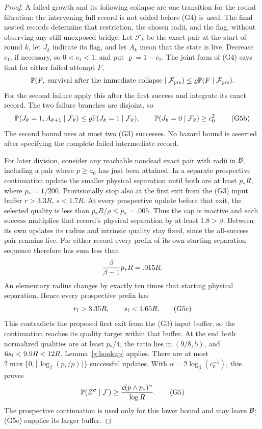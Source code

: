 \begin{proof}
A failed growth and its following collapse are one transition for the
round filtration: the intervening full record is not added before (G4)
is used.  The final nested records determine that restriction, the chosen
radii, and the flag, without observing any still unexposed bridge.  Let
\(\mathcal F_k\) be the exact pair at the start of round \(k\), let
\(J_k\) indicate its flag, and let \(A_k\) mean that the state is live.
Decrease \(c_1\), if necessary, so \(0<c_1<1\), and put
\(\varrho=1-c_1\).  The joint form of (G4) says that for either failed
attempt \(F\),
\[
 \mathbb P(F,\text{ survival after the immediate collapse}\mid
                  \mathcal F_{\rm pre})
 \le\varrho\mathbb P(F\mid\mathcal F_{\rm pre}).
\]
For the second failure apply this after the first success and integrate
its exact record.  The two failure branches are disjoint, so
\[
 \mathbb P(J_k=1,A_{k+1}\mid\mathcal F_k)
       \le\varrho\mathbb P(J_k=1\mid\mathcal F_k),\qquad
 \mathbb P(J_k=0\mid\mathcal F_k)\ge c_0^2.                    \tag{G5b}
\]
The second bound uses at most two (G3) successes.  No hazard bound is
asserted after specifying the complete failed intermediate record.

For later division, consider any reachable nondead exact pair with radii
in \({\cal B}\), including a pair where \(p\ge a_0\) has just been
attained.  In a separate prospective continuation update the smaller
physical separation until both are at least \(p_*R\), where
\(p_*=1/200\).  Provisionally stop also at the first exit from the (G3)
input buffer \(r>3.3R\), \(s<1.7R\).  At every prospective update before
that exit, the selected quality is less than \(p_*R/\rho\le p_*=.005\).
Thus the cap is inactive and each success multiplies that record's physical
separation by at least \(1.8>\beta\).  Between its own updates its radius
and intrinsic quality stay fixed, since the all-success pair remains live.
For either record every prefix of its own starting-separation sequence
therefore has sum less than
\[
 {\beta\over\beta-1}p_*R=.015R.
\]
An elementary radius changes by exactly ten times that starting physical
separation.  Hence every prospective prefix has
\[
 r_{\rm f}>3.35R,\qquad s_{\rm f}<1.65R.                   \tag{G5c}
\]
This contradicts the proposed first exit from the (G3) input buffer, so
the continuation reaches its quality target within that buffer.  At the
end both normalized qualities
are at least \(p_*/4\), the ratio lies in \((9/8,5)\), and
\(6s_{\rm f}<9.9R<12R\).  Lemma~\ref{g:hookup} applies.  There are at
most \(2\max\{0,\lceil\log_\beta(p_*/p)\rceil\}\) successful updates.
With \(\alpha=2\log_\beta(c_0^{-1})\), this proves
\[
 \mathbb P(Z^\sigma\mid\mathcal F)
       \ge {c(p\wedge p_*)^\alpha\over\log R}.             \tag{G5}
\]
The prospective continuation is used only for this lower bound and may
leave \({\cal B}\); (G5c) supplies its larger buffer.


\end{proof}

